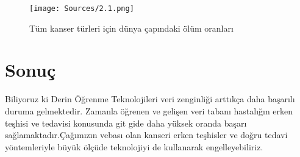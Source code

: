 \documentclass[isoft]{ssltexposter}
\begin{document}
\begin{poster}
            \begin{figure}
                \centering
                \captionsetup{type=figure}
                \texttt{[image: Sources/2.1.png]}
                \caption{Tüm kanser türleri için dünya çapındaki ölüm oranları\cite{DatasaboutCancer}}
            \end{figure}
    
    \section{Sonuç}
    
        Biliyoruz ki Derin Öğrenme Teknolojileri veri zenginliği arttıkça daha başarılı duruma gelmektedir. Zamanla öğrenen ve gelişen veri tabanı hastalığın erken teşhisi ve tedavisi konusunda git gide daha yüksek oranda başarı sağlamaktadır.Çağımızın vebası olan kanseri erken teşhisler ve doğru tedavi yöntemleriyle büyük ölçüde teknolojiyi de kullanarak engelleyebiliriz.



        
        
        
    
        \end{poster}
        
\end{document}
